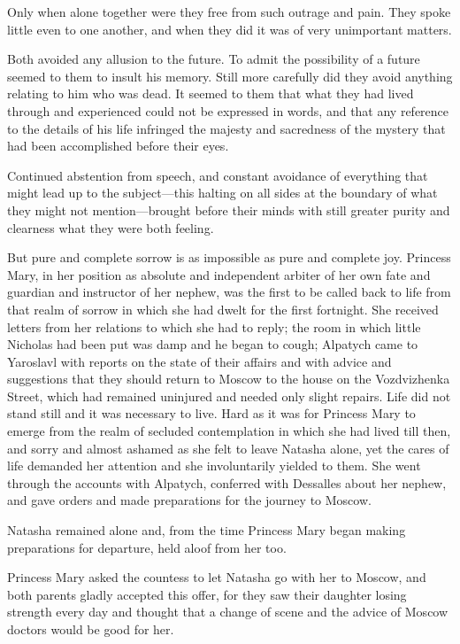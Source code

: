 Only when alone together were they free from such outrage and
pain. They spoke little even to one another, and when they did it
was of very unimportant matters.

Both avoided any allusion to the future. To admit the possibility
of a future seemed to them to insult his memory. Still more
carefully did they avoid anything relating to him who was
dead. It seemed to them that what they had lived through and
experienced could not be expressed in words, and that any
reference to the details of his life infringed the majesty and
sacredness of the mystery that had been accomplished before their
eyes.

Continued abstention from speech, and constant avoidance of
everything that might lead up to the subject---this halting on
all sides at the boundary of what they might not
mention---brought before their minds with still greater purity
and clearness what they were both feeling.

But pure and complete sorrow is as impossible as pure and
complete joy.  Princess Mary, in her position as absolute and
independent arbiter of her own fate and guardian and instructor
of her nephew, was the first to be called back to life from that
realm of sorrow in which she had dwelt for the first
fortnight. She received letters from her relations to which she
had to reply; the room in which little Nicholas had been put was
damp and he began to cough; Alpatych came to Yaroslavl with
reports on the state of their affairs and with advice and
suggestions that they should return to Moscow to the house on the
Vozdvizhenka Street, which had remained uninjured and needed only
slight repairs. Life did not stand still and it was necessary to
live. Hard as it was for Princess Mary to emerge from the realm
of secluded contemplation in which she had lived till then, and
sorry and almost ashamed as she felt to leave Natasha alone, yet
the cares of life demanded her attention and she involuntarily
yielded to them. She went through the accounts with Alpatych,
conferred with Dessalles about her nephew, and gave orders and
made preparations for the journey to Moscow.

Natasha remained alone and, from the time Princess Mary began
making preparations for departure, held aloof from her too.

Princess Mary asked the countess to let Natasha go with her to
Moscow, and both parents gladly accepted this offer, for they saw
their daughter losing strength every day and thought that a
change of scene and the advice of Moscow doctors would be good
for her.

